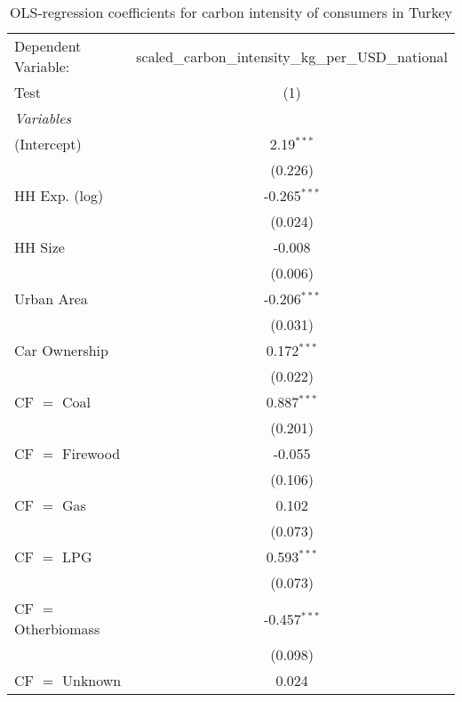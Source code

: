 
\begin{table}[htbp!]
   \centering
   \small
   \begin{adjustbox}{width = 1\textwidth, max height = 0.95\textheight, center}
      \begin{threeparttable}[b]
         \caption{\label{tab:OLS_1_TUR} OLS-regression coefficients for carbon intensity of consumers in Turkey}
         \begin{tabular}{lc}
            \tabularnewline \midrule \midrule
            Dependent Variable: & scaled\_carbon\_intensity\_kg\_per\_USD\_national\\        
            Test                & (1)\\  
            \midrule
            \emph{Variables}\\
            (Intercept)         & 2.19$^{***}$\\   
                                & (0.226)\\   
            HH Exp. (log)       & -0.265$^{***}$\\   
                                & (0.024)\\   
            HH Size             & -0.008\\   
                                & (0.006)\\   
            Urban Area          & -0.206$^{***}$\\   
                                & (0.031)\\   
            Car Ownership       & 0.172$^{***}$\\   
                                & (0.022)\\   
            CF $=$ Coal         & 0.887$^{***}$\\   
                                & (0.201)\\   
            CF $=$ Firewood     & -0.055\\   
                                & (0.106)\\   
            CF $=$ Gas          & 0.102\\   
                                & (0.073)\\   
            CF $=$ LPG          & 0.593$^{***}$\\   
                                & (0.073)\\   
            CF $=$ Otherbiomass & -0.457$^{***}$\\   
                                & (0.098)\\   
            CF $=$ Unknown      & 0.024\\   

\end{tabular}
\end{threeparttable}
\end{adjustbox}
\end{table}
